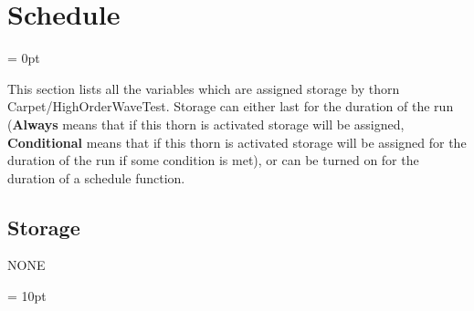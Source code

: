 
\section{Schedule} 


\parskip = 0pt


\noindent This section lists all the variables which are assigned storage by thorn Carpet/HighOrderWaveTest.  Storage can either last for the duration of the run ({\bf Always} means that if this thorn is activated storage will be assigned, {\bf Conditional} means that if this thorn is activated storage will be assigned for the duration of the run if some condition is met), or can be turned on for the duration of a schedule function.


\subsection*{Storage}NONE

\vspace{5mm}\parskip = 10pt 

